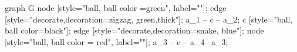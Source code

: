graph G {
    node [style="ball, ball color =green", label=""];
    edge [style="decorate,decoration=zigzag, green,thick"];
    a_1 -- c -- a_2;
    c [style="ball, ball color=black"];
    edge [style="decorate,decoration=snake, blue"];
    node [style="ball, ball color = red", label=""];
    a_3 -- c -- a_4 --a_3;
}
